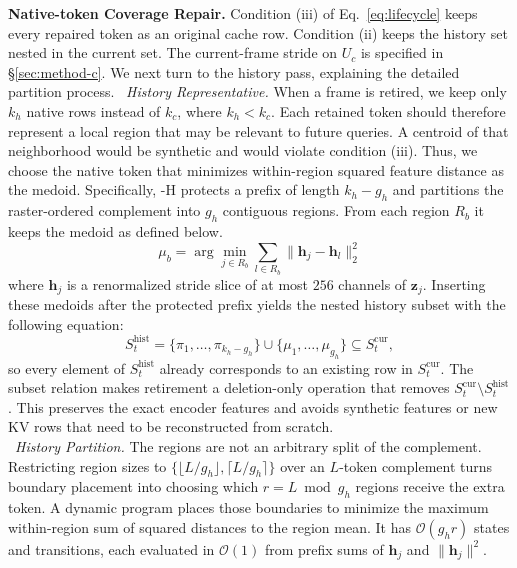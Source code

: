 \noindent\textbf{Native-token Coverage Repair.}
Condition (iii) of Eq.~\ref{eq:lifecycle} keeps every repaired token as an original cache row.
%
Condition (ii) keeps the history set nested in the current set.
%
The current-frame stride on $U_c$ is specified in \S\ref{sec:method-c}.
%
We next turn to the history pass, explaining the detailed partition process.
%
\noindent{}~\textit{History Representative.}
When a frame is retired, we keep only $k_h$ native rows instead of $k_c$, where $k_h<k_c$.
%
Each retained token should therefore represent a local region that may be relevant to future queries.
%
A centroid of that neighborhood would be synthetic and would violate condition (iii).
%
Thus, we choose the native token that minimizes within-region squared feature distance as the medoid.
%
Specifically, \awc{}-H protects a prefix of length $k_h-g_h$ and partitions the raster-ordered complement into $g_h$ contiguous regions.
%
From each region $R_b$ it keeps the medoid as defined below.
\begin{equation}
    \mu_b
    =
    \arg\min_{j\in R_b}
    \sum_{l\in R_b}
    \bigl\lVert\mathbf h_j-\mathbf h_l\bigr\rVert_2^2
    \label{eq:medoid}
\end{equation}
where $\mathbf h_j$ is a renormalized stride slice of at most $256$ channels of $\mathbf z_j$.
%
Inserting these medoids after the protected prefix yields the nested history subset with the following equation:
\begin{equation}
    S_t^{\mathrm{hist}}
    =
    \{\pi_1,\ldots,\pi_{k_h-g_h}\}
    \cup
    \{\mu_1,\ldots,\mu_{g_h}\}
    \subseteq S_t^{\mathrm{cur}},
    \label{eq:admit}
\end{equation}
so every element of $S_t^{\mathrm{hist}}$ already corresponds to an existing row in $S_t^{\mathrm{cur}}$.
The subset relation makes retirement a deletion-only operation that removes $S_t^{\mathrm{cur}}\setminus S_t^{\mathrm{hist}}$.
This preserves the exact encoder features and avoids synthetic features or new KV rows that need to be reconstructed from scratch.
\\
\noindent{}~\textit{History Partition.}
The regions are not an arbitrary split of the complement.
%
Restricting region sizes to $\{\lfloor L/g_h\rfloor,\lceil L/g_h\rceil\}$ over an $L$-token complement turns boundary placement into choosing which $r=L\bmod g_h$ regions receive the extra token.
%
A dynamic program places those boundaries to minimize the maximum within-region sum of squared distances to the region mean.
%
It has $\mathcal{O}(g_h r)$ states and transitions, each evaluated in $\mathcal{O}(1)$ from prefix sums of $\mathbf{h}_j$ and $\lVert\mathbf{h}_j\rVert^2$.
